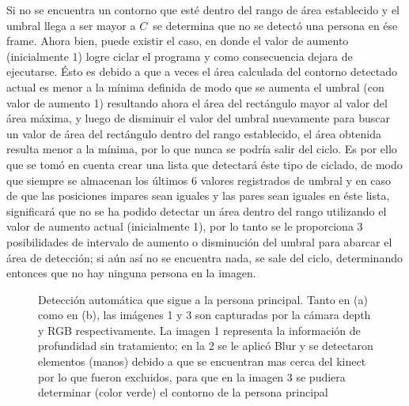 \documentclass[a4paper,openright,12pt]{report}
\begin{document}
\begin{figure}[H]
\end{figure} Si no se encuentra un contorno que esté dentro del rango de área establecido y el umbral llega a ser mayor a  $C$\ se determina que no se detectó una persona en ése frame. Ahora bien, puede existir el caso, en donde el valor de aumento (inicialmente 1) logre ciclar el programa y como consecuencia dejara de ejecutarse. Ésto es debido a que a veces el área calculada del contorno detectado actual es menor a la mínima definida de modo que se aumenta el umbral (con valor de aumento 1) resultando ahora el área del rectángulo mayor al valor del área máxima, y luego de disminuir el valor del umbral nuevamente para buscar un valor de área del rectángulo dentro del rango establecido, el área obtenida resulta menor a la mínima, por lo que nunca se podría salir del ciclo. Es por ello que se tomó en cuenta crear una lista que detectará éste tipo de ciclado, de modo que siempre se almacenan los últimos 6 valores registrados de umbral y en caso de que las posiciones impares sean iguales y las pares sean iguales en éste lista, significará que no se ha podido detectar un área dentro del rango utilizando el valor de aumento actual (inicialmente 1), por lo tanto se le proporciona 3 posibilidades de intervalo de aumento o disminución del umbral para abarcar el área de detección; si aún así no se encuentra nada, se sale del ciclo, determinando entonces que no hay ninguna persona en la imagen.\\
\begin{figure}[H]
	\centering
	\caption[Detección automática que sigue a la persona principal]{Detección automática que sigue a la persona principal. Tanto en (a) como en (b), las imágenes 1 y 3 son capturadas por la cámara depth y RGB respectivamente. La imagen 1 representa la información de profundidad sin tratamiento; en la 2 se le aplicó Blur y se detectaron elementos (manos) debido a que se encuentran mas cerca del kinect por lo que fueron excluidos, para que en la imagen 3 se pudiera determinar (color verde) el contorno de la persona principal} 
	\label{fig:deteccAutoManos}
\end{figure}
\end{document}
